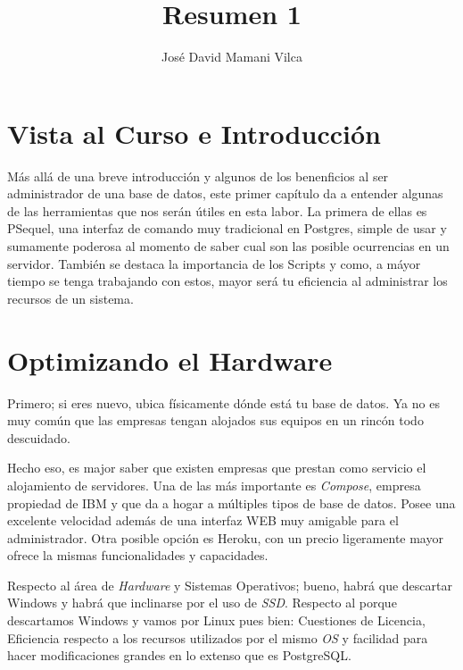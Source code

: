 \documentclass[12pt,conference]{IEEEtran}
\begin{document}
\title{Resumen 1}

\author{José David Mamani Vilca}%

\onecolumn

\maketitle

\section{Vista al Curso e Introducción}

Más allá de una breve introducción y algunos de los benenficios al ser administrador de una base de datos, este primer capítulo da a entender algunas de las herramientas que nos serán útiles en esta labor. La primera de ellas es PSequel, una interfaz de comando muy tradicional en Postgres, simple de usar y sumamente poderosa al momento de saber cual son las posible ocurrencias en un servidor. También se destaca la importancia de los Scripts y como, a máyor tiempo se tenga trabajando con estos, mayor será tu eficiencia al administrar los recursos de un sistema.

\section{Optimizando el Hardware}

Primero; si eres nuevo, ubica físicamente dónde está tu base de datos. Ya no es muy común que las empresas tengan alojados sus equipos en un rincón todo descuidado.

Hecho eso, es major saber que existen empresas que prestan como servicio el alojamiento de servidores. Una de las más importante es \textit{Compose}, empresa propiedad de IBM y que da a hogar a múltiples tipos de base de datos. Posee una excelente velocidad además de una interfaz WEB muy amigable para el administrador. Otra posible opción es Heroku, con un precio ligeramente mayor ofrece la mismas funcionalidades y capacidades.

Respecto al área de \textit{Hardware} y Sistemas Operativos; bueno, habrá que descartar Windows y habrá que inclinarse por el uso de \textit{SSD}. Respecto al porque descartamos Windows y vamos por Linux pues bien: Cuestiones de Licencia, Eficiencia respecto a los recursos utilizados por el mismo \textit{OS} y facilidad para hacer modificaciones grandes en lo extenso que es PostgreSQL.
\end{document}
